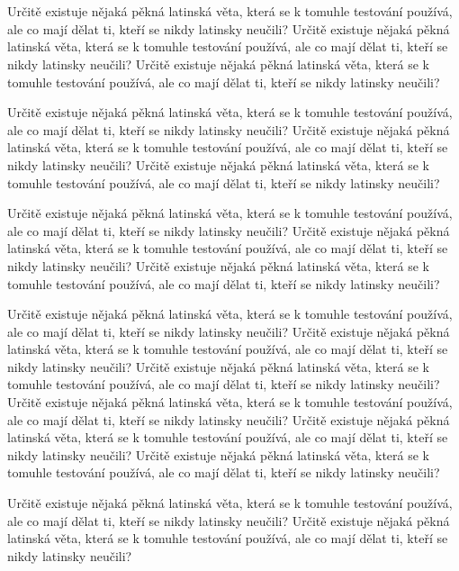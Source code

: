 \documentclass[11pt,oneside,a4paper]{book}
\begin{document}
\section*{}
Určitě existuje nějaká pěkná latinská věta, která se k tomuhle testování používá, ale co mají dělat ti, kteří se nikdy latinsky neučili? Určitě existuje nějaká pěkná latinská věta, která se k tomuhle testování používá, ale co mají dělat ti, kteří se nikdy latinsky neučili? Určitě existuje nějaká pěkná latinská věta, která se k tomuhle testování používá, ale co mají dělat ti, kteří se nikdy latinsky neučili?

Určitě existuje nějaká pěkná latinská věta, která se k tomuhle testování používá, ale co mají dělat ti, kteří se nikdy latinsky neučili? Určitě existuje nějaká pěkná latinská věta, která se k tomuhle testování používá, ale co mají dělat ti, kteří se nikdy latinsky neučili? Určitě existuje nějaká pěkná latinská věta, která se k tomuhle testování používá, ale co mají dělat ti, kteří se nikdy latinsky neučili?

Určitě existuje nějaká pěkná latinská věta, která se k tomuhle testování používá, ale co mají dělat ti, kteří se nikdy latinsky neučili? Určitě existuje nějaká pěkná latinská věta, která se k tomuhle testování používá, ale co mají dělat ti, kteří se nikdy latinsky neučili? Určitě existuje nějaká pěkná latinská věta, která se k tomuhle testování používá, ale co mají dělat ti, kteří se nikdy latinsky neučili?

Určitě existuje nějaká pěkná latinská věta, která se k tomuhle testování používá, ale co mají dělat ti, kteří se nikdy latinsky neučili? Určitě existuje nějaká pěkná latinská věta, která se k tomuhle testování používá, ale co mají dělat ti, kteří se nikdy latinsky neučili? Určitě existuje nějaká pěkná latinská věta, která se k tomuhle testování používá, ale co mají dělat ti, kteří se nikdy latinsky neučili? Určitě existuje nějaká pěkná latinská věta, která se k tomuhle testování používá, ale co mají dělat ti, kteří se nikdy latinsky neučili? Určitě existuje nějaká pěkná latinská věta, která se k tomuhle testování používá, ale co mají dělat ti, kteří se nikdy latinsky neučili? Určitě existuje nějaká pěkná latinská věta, která se k tomuhle testování používá, ale co mají dělat ti, kteří se nikdy latinsky neučili?

Určitě existuje nějaká pěkná latinská věta, která se k tomuhle testování používá, ale co mají dělat ti, kteří se nikdy latinsky neučili? Určitě existuje nějaká pěkná latinská věta, která se k tomuhle testování používá, ale co mají dělat ti, kteří se nikdy latinsky neučili?
\end{document}
